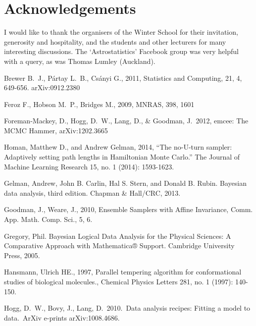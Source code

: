 \section{Acknowledgements}
I would like to thank the organisers of the Winter School for their invitation,
generosity and hospitality, and the students and other lecturers for many
interesting discussions. The `Astrostatistics' Facebook group was very helpful
with a query, as was Thomas Lumley (Auckland).

\begin{thebibliography}{999}
 Brewer B.~J., P{\'a}rtay L.~B., Cs{\'a}nyi G., 2011,
Statistics and Computing, 21, 4, 649-656. arXiv:0912.2380

 Feroz F., Hobson M.~P., Bridges M., 2009, MNRAS, 398, 1601

 Foreman-Mackey, 
D., Hogg, D.~W., Lang, D., \& Goodman, J.\ 2012, emcee: The MCMC Hammer, arXiv:1202.3665 

Homan, Matthew D., and Andrew Gelman, 2014, ``The no-U-turn sampler: Adaptively setting path lengths in Hamiltonian Monte Carlo.'' The Journal of Machine Learning Research 15, no. 1 (2014): 1593-1623.

Gelman, Andrew, John B. Carlin, Hal S. Stern, and Donald B. Rubin. Bayesian data analysis, third edition. Chapman \& Hall/CRC, 2013.

Goodman, J., Weare, J., 2010, Ensemble Samplers with Affine Invariance, Comm. App. Math. Comp. Sci., 5, 6.

Gregory, Phil. Bayesian Logical Data Analysis for the Physical Sciences: A Comparative Approach with Mathematica® Support. Cambridge University Press, 2005.

 Hansmann, Ulrich HE.,
1997, Parallel tempering algorithm for conformational studies of biological
molecules., Chemical Physics Letters 281, no. 1 (1997): 140-150.

 Hogg, D.~W., Bovy, J., 
Lang, D.\ 2010.\ Data analysis recipes: Fitting a model to data.\ ArXiv 
e-prints arXiv:1008.4686. 


\end{thebibliography}
